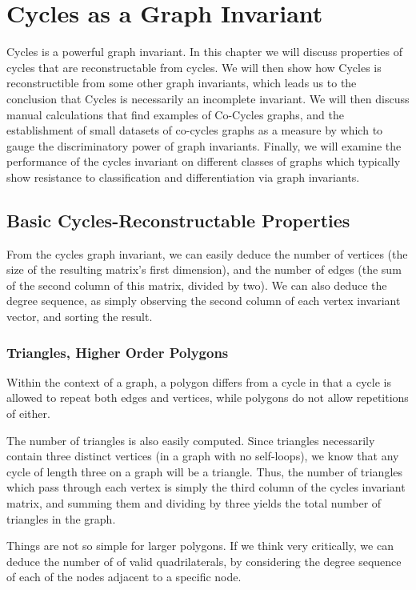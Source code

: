 \chapter{Cycles as a Graph Invariant}
Cycles is a powerful graph invariant.
In this chapter we will discuss properties of cycles that are reconstructable from cycles.
We will then show how Cycles is reconstructible from some other graph invariants, which leads us to the conclusion that Cycles is necessarily an incomplete invariant.
We will then discuss manual calculations that find examples of Co-Cycles graphs, and the establishment of small datasets of co-cycles graphs as a measure by which to gauge the discriminatory power of graph invariants.
Finally, we will examine the performance of the cycles invariant on different classes of graphs which typically show resistance to classification and differentiation via graph invariants.

\section{Basic Cycles-Reconstructable Properties}

From the cycles graph invariant, we can easily deduce the number of vertices (the size of the resulting matrix's first dimension), and the number of edges (the sum of the second column of this matrix, divided by two).
We can also deduce the degree sequence, as simply observing the second column of each vertex invariant vector, and sorting the result.

\subsection{Triangles, Higher Order Polygons}
Within the context of a graph, a polygon differs from a cycle in that a cycle is allowed to repeat both edges and vertices, while polygons do not allow repetitions of either.

The number of triangles is also easily computed.  Since triangles necessarily contain three distinct vertices (in a graph with no self-loops), we know that any cycle of length three on a graph will be a triangle.
Thus, the number of triangles which pass through each vertex is simply the third column of the cycles invariant matrix, and summing them and dividing by three yields the total number of triangles in the graph.

Things are not so simple for larger polygons.  If we think very critically, we can deduce the number of of valid quadrilaterals, by considering the degree sequence of each of the nodes adjacent to a specific node.

